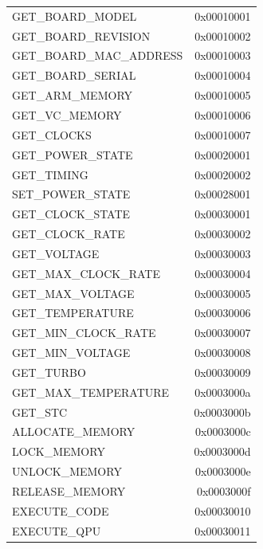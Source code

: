 \documentclass[12pt, svgnames]{book}
\begin{document}
\begin{centering}
{\begin{longtable}{|l | r |}
		 GET\_BOARD\_MODEL &                        0x00010001\\
		 GET\_BOARD\_REVISION &                     0x00010002\\
		 GET\_BOARD\_MAC\_ADDRESS &                  0x00010003\\
		 GET\_BOARD\_SERIAL &                       0x00010004\\
		 GET\_ARM\_MEMORY &                         0x00010005\\
		 GET\_VC\_MEMORY &                          0x00010006\\
		 GET\_CLOCKS &                             0x00010007\\
		 GET\_POWER\_STATE &                        0x00020001\\
		 GET\_TIMING &                             0x00020002\\
		 SET\_POWER\_STATE &                        0x00028001\\
		 GET\_CLOCK\_STATE &                        0x00030001\\
		 GET\_CLOCK\_RATE &                         0x00030002\\
		 GET\_VOLTAGE &                            0x00030003\\
		 GET\_MAX\_CLOCK\_RATE &                     0x00030004\\
		 GET\_MAX\_VOLTAGE &                        0x00030005\\
		 GET\_TEMPERATURE &                        0x00030006\\
		 GET\_MIN\_CLOCK\_RATE &                     0x00030007\\
		 GET\_MIN\_VOLTAGE &                        0x00030008\\
		 GET\_TURBO &                              0x00030009\\
		 GET\_MAX\_TEMPERATURE &                    0x0003000a\\
		 GET\_STC &                                0x0003000b\\
		 ALLOCATE\_MEMORY &                        0x0003000c\\
		 LOCK\_MEMORY &                            0x0003000d\\
		 UNLOCK\_MEMORY &                          0x0003000e\\
		 RELEASE\_MEMORY &                         0x0003000f\\
		 EXECUTE\_CODE &                           0x00030010\\
		 EXECUTE\_QPU &                            0x00030011\\

\end{longtable}}
\end{centering}
\end{document}
